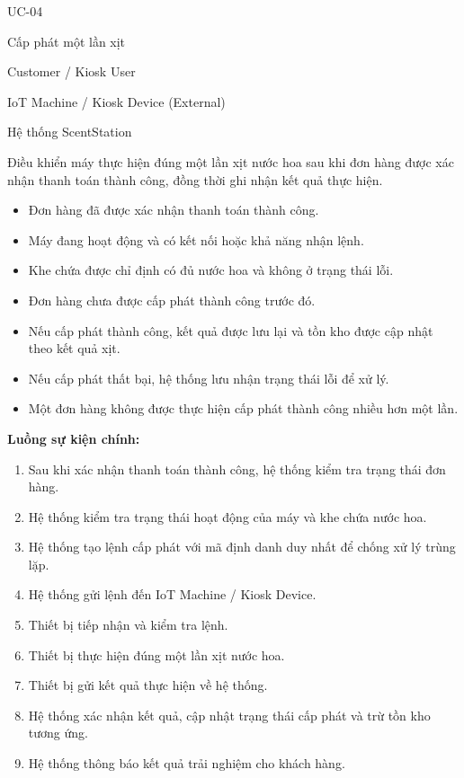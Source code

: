 \begin{description}[leftmargin=3.5cm,style=nextline]
    \item[Mã Use Case:] UC-04
    \item[Tên Use Case:] Cấp phát một lần xịt
    \item[Tác nhân chính:] Customer / Kiosk User
    \item[Tác nhân phụ:] IoT Machine / Kiosk Device (External)
    \item[Tác nhân liên quan:] Hệ thống ScentStation
    \item[Mục tiêu:] Điều khiển máy thực hiện đúng một lần xịt nước hoa sau khi đơn hàng được xác nhận thanh toán thành công, đồng thời ghi nhận kết quả thực hiện.
    \item[Tiền điều kiện:]
    \begin{itemize}
        \item Đơn hàng đã được xác nhận thanh toán thành công.
        \item Máy đang hoạt động và có kết nối hoặc khả năng nhận lệnh.
        \item Khe chứa được chỉ định có đủ nước hoa và không ở trạng thái lỗi.
        \item Đơn hàng chưa được cấp phát thành công trước đó.
    \end{itemize}
    \item[Hậu điều kiện:]
    \begin{itemize}
        \item Nếu cấp phát thành công, kết quả được lưu lại và tồn kho được cập nhật theo kết quả xịt.
        \item Nếu cấp phát thất bại, hệ thống lưu nhận trạng thái lỗi để xử lý.
        \item Một đơn hàng không được thực hiện cấp phát thành công nhiều hơn một lần.
    \end{itemize}
\end{description}

\textbf{Luồng sự kiện chính:}
\begin{enumerate}
    \item Sau khi xác nhận thanh toán thành công, hệ thống kiểm tra trạng thái đơn hàng.
    \item Hệ thống kiểm tra trạng thái hoạt động của máy và khe chứa nước hoa.
    \item Hệ thống tạo lệnh cấp phát với mã định danh duy nhất để chống xử lý trùng lặp.
    \item Hệ thống gửi lệnh đến IoT Machine / Kiosk Device.
    \item Thiết bị tiếp nhận và kiểm tra lệnh.
    \item Thiết bị thực hiện đúng một lần xịt nước hoa.
    \item Thiết bị gửi kết quả thực hiện về hệ thống.
    \item Hệ thống xác nhận kết quả, cập nhật trạng thái cấp phát và trừ tồn kho tương ứng.
    \item Hệ thống thông báo kết quả trải nghiệm cho khách hàng.
\end{enumerate}


